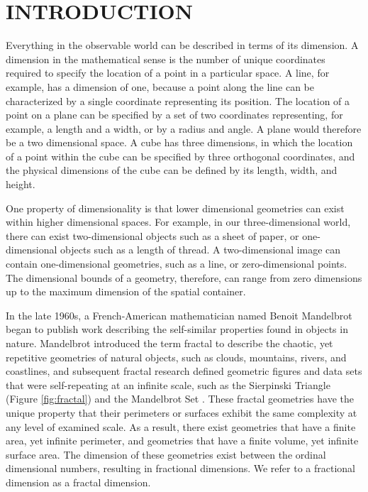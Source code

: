 \documentclass[12pt, oneside]{book}
\begin{document}
\chapter{\textbf{INTRODUCTION}}
Everything in the observable world can be described in terms of its dimension.  A dimension in the mathematical sense is the number of unique coordinates required to specify the location of a point in a particular space.  A line, for example, has a dimension of one, because a point along the line can be characterized by a single coordinate representing its position.  The location of a point on a plane can be specified by a set of two coordinates representing, for example, a length and a width, or by a radius and angle.  A plane would therefore be a two dimensional space.  A cube has three dimensions, in which the location of a point within the cube can be specified by three orthogonal coordinates, and the physical dimensions of the cube can be defined by its length, width, and height.

One property of dimensionality is that lower dimensional geometries can exist within higher dimensional spaces.  For example, in our three-dimensional world, there can exist two-dimensional objects such as a sheet of paper, or one-dimensional objects such as a length of thread.  A two-dimensional image can contain one-dimensional geometries, such as a line, or zero-dimensional points.  The dimensional bounds of a geometry, therefore, can range from zero dimensions up to the maximum dimension of the spatial container.

In the late 1960s, a French-American mathematician named Benoit Mandelbrot began to publish work describing the self-similar properties found in objects in nature. Mandelbrot introduced the term fractal to describe the chaotic, yet repetitive geometries of natural objects, such as clouds, mountains, rivers, and coastlines, and subsequent fractal research defined geometric figures and data sets that were self-repeating at an infinite scale, such as the Sierpinski Triangle (Figure \ref{fig:fractal}) and the Mandelbrot Set \cite{gomory_benoit_2010}.  These fractal geometries have the unique property that their perimeters or surfaces exhibit the same complexity at any level of examined scale.  As a result, there exist geometries that have a finite area, yet infinite perimeter, and geometries that have a finite volume, yet infinite surface area.  The dimension of these geometries exist between the ordinal dimensional numbers, resulting in fractional dimensions.  We refer to a fractional dimension as a fractal dimension.
\end{document}
